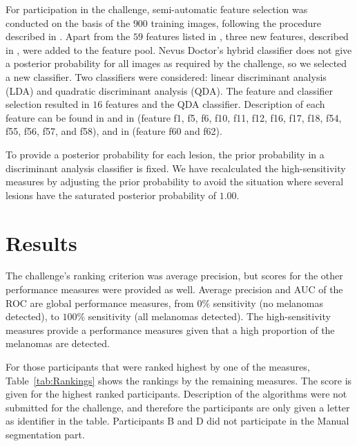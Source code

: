 \documentclass[a4paper,12pt]{article}
\begin{document}
For participation in the challenge, semi-automatic feature selection was conducted on the basis of the $900$ training images, following the procedure described in \cite{Mollersen2015Improved}. Apart from the $59$ features listed in \cite{Mollersen2015Improved}, three new features, described in \cite{Mollersen2015Divergencebased}, were added to the feature pool. Nevus Doctor's hybrid classifier does not give a posterior probability for all images as required by the challenge, so we selected a new classifier. Two classifiers were considered: linear discriminant analysis (LDA) and quadratic discriminant analysis (QDA). The feature and classifier selection resulted in $16$ features and the QDA classifier. Description of each feature can be found in \cite{Mollersen2015Improved} and in \cite{Zortea2014Performance} (feature f1, f5, f6, f10, f11, f12, f16, f17, f18, f54, f55, f56, f57, and f58), and in  \cite{Mollersen2015Divergencebased} (feature f60 and f62).

To provide a posterior probability for each lesion, the prior probability in a discriminant analysis classifier is fixed. We have recalculated the high-sensitivity measures by adjusting the prior probability to avoid the situation where several lesions have the saturated posterior probability of $1.00$. 

\section{Results} \label{sec:Results}

The challenge's ranking criterion was average precision, but scores for the other performance measures were provided as well.  
Average precision and AUC of the ROC are global performance measures, from $0\%$ sensitivity (no melanomas detected), to $100\%$ sensitivity (all melanomas detected). The high-sensitivity measures provide a performance measures given that a high proportion of the melanomas are detected. 

For those participants that were ranked highest by one of the measures, Table~\ref{tab:Rankings} shows the rankings
by the remaining measures. The score is given for the highest ranked participants. Description of the algorithms were not submitted for the challenge, and therefore the participants are only given a letter as identifier in the table. Participants B and D did not participate in the Manual segmentation part. 
\end{document}
